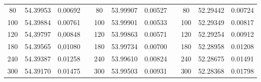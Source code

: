 \begin{table}[]
\begin{tabular}{ccccccccccc}
\multicolumn{1}{|c|}{80}          & \multicolumn{1}{c|}{54.39953} & \multicolumn{1}{c|}{0.00692}        & \multicolumn{1}{l|}{} & \multicolumn{1}{c|}{80}          & \multicolumn{1}{c|}{53.99907} & \multicolumn{1}{c|}{0.00527}        & \multicolumn{1}{l|}{} & \multicolumn{1}{c|}{80}          & \multicolumn{1}{c|}{52.29442} & \multicolumn{1}{c|}{0.00724}        \\ \cline{1-3} \cline{5-7} \cline{9-11} 
\multicolumn{1}{|c|}{100}         & \multicolumn{1}{c|}{54.39884} & \multicolumn{1}{c|}{0.00761}        & \multicolumn{1}{c|}{} & \multicolumn{1}{c|}{100}         & \multicolumn{1}{c|}{53.99901} & \multicolumn{1}{c|}{0.00533}        & \multicolumn{1}{c|}{} & \multicolumn{1}{c|}{100}         & \multicolumn{1}{c|}{52.29349} & \multicolumn{1}{c|}{0.00817}        \\ \cline{1-3} \cline{5-7} \cline{9-11} 
\multicolumn{1}{|c|}{120}         & \multicolumn{1}{c|}{54,39797} & \multicolumn{1}{c|}{0,00848}        & \multicolumn{1}{c|}{} & \multicolumn{1}{c|}{120}         & \multicolumn{1}{c|}{53.99863} & \multicolumn{1}{c|}{0.00571}        & \multicolumn{1}{c|}{} & \multicolumn{1}{c|}{120}         & \multicolumn{1}{c|}{52.29254} & \multicolumn{1}{c|}{0.00912}        \\ \cline{1-3} \cline{5-7} \cline{9-11} 
\multicolumn{1}{|c|}{180}         & \multicolumn{1}{c|}{54.39565} & \multicolumn{1}{c|}{0,01080}        & \multicolumn{1}{c|}{} & \multicolumn{1}{c|}{180}         & \multicolumn{1}{c|}{53.99734} & \multicolumn{1}{c|}{0.00700}        & \multicolumn{1}{c|}{} & \multicolumn{1}{c|}{180}         & \multicolumn{1}{c|}{52.28958} & \multicolumn{1}{c|}{0.01208}        \\ \cline{1-3} \cline{5-7} \cline{9-11} 
\multicolumn{1}{|c|}{240}         & \multicolumn{1}{c|}{54.39387} & \multicolumn{1}{c|}{0.01258}        & \multicolumn{1}{c|}{} & \multicolumn{1}{c|}{240}         & \multicolumn{1}{c|}{53.99610} & \multicolumn{1}{c|}{0.00824}        & \multicolumn{1}{c|}{} & \multicolumn{1}{c|}{240}         & \multicolumn{1}{c|}{52.28675} & \multicolumn{1}{c|}{0.01491}        \\ \cline{1-3} \cline{5-7} \cline{9-11} 
\multicolumn{1}{|c|}{300}         & \multicolumn{1}{c|}{54.39170} & \multicolumn{1}{c|}{0.01475}        & \multicolumn{1}{c|}{} & \multicolumn{1}{c|}{300}         & \multicolumn{1}{c|}{53.99503} & \multicolumn{1}{c|}{0.00931}        & \multicolumn{1}{c|}{} & \multicolumn{1}{c|}{300}         & \multicolumn{1}{c|}{52.28368} & \multicolumn{1}{c|}{0.01798}        \\ \cline{1-3} \cline{5-7} \cline{9-11} 

\end{tabular}
\end{table}
